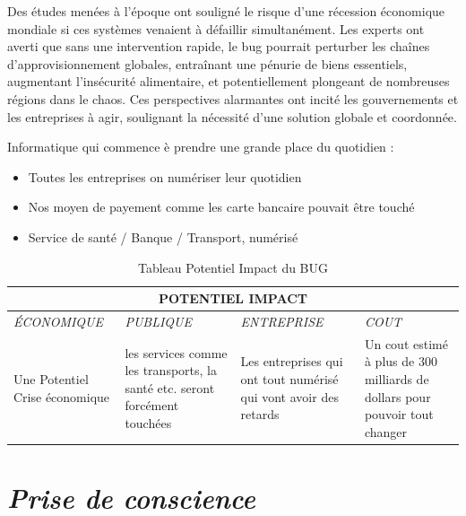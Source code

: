 \documentclass[12pt,a4paper]{article}
\begin{document}
Des études menées à l'époque ont souligné le risque d'une récession économique mondiale si ces systèmes venaient à défaillir simultanément. Les experts ont averti que sans une intervention rapide, le bug pourrait perturber les chaînes d'approvisionnement globales, entraînant une pénurie de biens essentiels, augmentant l'insécurité alimentaire, et potentiellement plongeant de nombreuses régions dans le chaos. Ces perspectives alarmantes ont incité les gouvernements et les entreprises à agir, soulignant la nécessité d'une solution globale et coordonnée. \\
\cite{arcticle}
\begin{center}
Informatique qui commence è prendre une grande place du quotidien :\cite{infoquo}\\

\begin{itemize}
\item Toutes les entreprises on numériser leur quotidien 
\item Nos moyen de payement comme les carte bancaire pouvait être touché 
\item Service de santé / Banque / Transport, numérisé 
\end{itemize}

\end{center}

\begin{table}[H]

\begin{tabular}{|p{2.5cm}|p{2.5cm}|p{2.5cm}|p{2.5cm}|}
\hline
\multicolumn{4}{|c|}{\textbf{\color{red}POTENTIEL IMPACT}} \\
\hline
\textit{ÉCONOMIQUE} & \textit{PUBLIQUE} & \textit{ENTREPRISE} & \textit{COUT} \\ \cline{1-4}
Une Potentiel Crise économique & les services comme les transports, la santé etc. seront forcément touchées & Les entreprises qui ont tout numérisé qui vont avoir des retards & Un cout estimé à plus de 300 milliards de dollars pour pouvoir tout changer \\ \cline{1-4}
\end{tabular}
\caption{Tableau Potentiel Impact du BUG}
\end{table}






\newpage
\section{\textit{Prise de conscience}}
\end{document}
